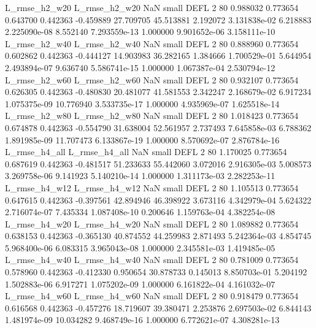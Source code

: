  L_rmse_h2_w20  L_rmse_h2_w20                   NaN      small     DEFL                 2 80 0.988032       0.773654 0.643700       0.442363   -0.459889     27.709705     45.513881     2.192072   3.131838e-02  6.218883 2.225090e-08     8.552140   7.293559e-13            1.000000    9.901652e-06        3.158111e-10
 L_rmse_h2_w40  L_rmse_h2_w40                   NaN      small     DEFL                 2 80 0.888960       0.773654 0.602862       0.442363   -0.444127     14.903983     36.282165     1.384666   1.700529e-01  5.644954 2.493894e-07     9.636740   5.586741e-15            1.000000    1.067387e-04        2.530794e-12
 L_rmse_h2_w60  L_rmse_h2_w60                   NaN      small     DEFL                 2 80 0.932107       0.773654 0.626305       0.442363   -0.480830     20.481077     41.581553     2.342247   2.168679e-02  6.917234 1.075375e-09    10.776940   3.533735e-17            1.000000    4.935969e-07        1.625518e-14
 L_rmse_h2_w80  L_rmse_h2_w80                   NaN      small     DEFL                 2 80 1.018423       0.773654 0.674878       0.442363   -0.554790     31.638004     52.561957     2.737493   7.645858e-03  6.788362 1.891985e-09    11.707473   6.133867e-19            1.000000    8.570692e-07        2.876784e-16
 L_rmse_h4_all  L_rmse_h4_all                   NaN      small     DEFL                 2 80 1.170025       0.773654 0.687619       0.442363   -0.481517     51.233633     55.442060     3.072016   2.916305e-03  5.008573 3.269758e-06     9.141923   5.140210e-14            1.000000    1.311173e-03        2.282253e-11
 L_rmse_h4_w12  L_rmse_h4_w12                   NaN      small     DEFL                 2 80 1.105513       0.773654 0.647615       0.442363   -0.397561     42.894946     46.398922     3.673116   4.342979e-04  5.624322 2.716074e-07     7.435334   1.087408e-10            0.200646    1.159763e-04        4.382254e-08
 L_rmse_h4_w20  L_rmse_h4_w20                   NaN      small     DEFL                 2 80 1.089882       0.773654 0.638153       0.442363   -0.365130     40.874552     44.259983     2.871493   5.242364e-03  4.854745 5.968400e-06     6.083315   3.965043e-08            1.000000    2.345581e-03        1.419485e-05
 L_rmse_h4_w40  L_rmse_h4_w40                   NaN      small     DEFL                 2 80 0.781009       0.773654 0.578960       0.442363   -0.412330      0.950654     30.878733     0.145013   8.850703e-01  5.204192 1.502883e-06     6.917271   1.075202e-09            1.000000    6.161822e-04        4.161032e-07
 L_rmse_h4_w60  L_rmse_h4_w60                   NaN      small     DEFL                 2 80 0.918479       0.773654 0.616568       0.442363   -0.457276     18.719607     39.380471     2.253876   2.697503e-02  6.844143 1.481974e-09    10.034282   9.468749e-16            1.000000    6.772621e-07        4.308281e-13
